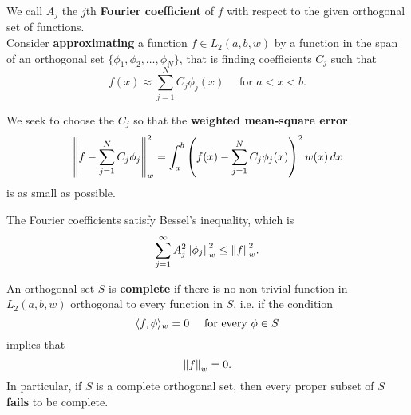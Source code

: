 


\bigskip
We call \(A_j\) the \(j\)th \textbf{Fourier coefficient} of \(f\) with respect to the given orthogonal set of functions. \\

Consider \textbf{approximating} a function \(f \in L_2(a, b, w)\) by a function in the span of an orthogonal set \(\{\phi_1, \phi_2, \dots, \phi_N \}\), that is finding coefficients \(C_j\) such that
\[f(x) \approx \sum_{j=1}^{N}C_j\phi_j(x) \quad \text{ for } a < x < b.\]

We seek to choose the \(C_j\) so that the \textbf{weighted mean-square error}
\[\norm{f - \sum_{j=1}^{N}C_j\phi_j}_w^2 = \int_a^b \left(f(x) - \sum_{j=1 }^{N}C_j\phi_j (x)\right)^2 w(x) \, dx\]
is as small as possible.


\bigskip
The Fourier coefficients satisfy Bessel's inequality, which is
\[\sum_{j=1}^{\infty} A_j^2 \norm{\phi_j}_w^2 \leq \norm{f}_w^2.\]

An orthogonal set \(S\) is \textbf{complete} if there is no non-trivial function in \(L_2(a, b, w)\) orthogonal to every function in \(S\), i.e. if the condition
\[\langle f, \phi \rangle_w = 0 \quad \text{ for every } \phi \in S\]
implies that
\[\norm{f}_w = 0.\]
In particular, if \(S\) is a complete orthogonal set, then every proper subset of \(S\) \textbf{fails} to be complete.


